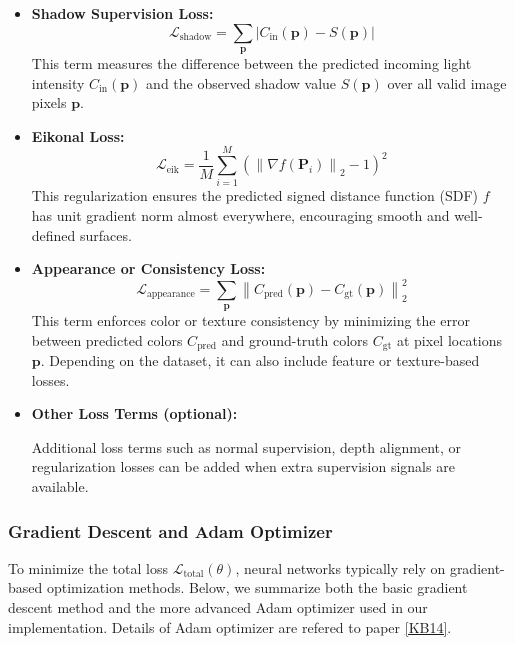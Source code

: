 \documentclass[12pt]{article}
\theoremstyle{definition}
\begin{document}
\begin{itemize}
    \item \textbf{Shadow Supervision Loss:}
    \begin{equation}
    \mathcal{L}_{\text{shadow}} = \sum_{\mathbf{p}} \left| C_{\mathrm{in}}(\mathbf{p}) - S(\mathbf{p}) \right|
    \end{equation}
    This term measures the difference between the predicted incoming light intensity $C_{\mathrm{in}}(\mathbf{p})$ and the observed shadow value $S(\mathbf{p})$ over all valid image pixels $\mathbf{p}$.

    \item \textbf{Eikonal Loss:}
    \begin{equation}
    \mathcal{L}_{\text{eik}} = \frac{1}{M} \sum_{i=1}^M \left( \left\| \nabla f(\mathbf{P}_i) \right\|_2 - 1 \right)^2
    \end{equation}
    This regularization ensures the predicted signed distance function (SDF) $f$ has unit gradient norm almost everywhere, encouraging smooth and well-defined surfaces.

    \item \textbf{Appearance or Consistency Loss:}
    \begin{equation}
    \mathcal{L}_{\text{appearance}} = \sum_{\mathbf{p}} \left\| C_{\text{pred}}(\mathbf{p}) - C_{\text{gt}}(\mathbf{p}) \right\|_2^2
    \end{equation}
    This term enforces color or texture consistency by minimizing the error between predicted colors $C_{\text{pred}}$ and ground-truth colors $C_{\text{gt}}$ at pixel locations $\mathbf{p}$. Depending on the dataset, it can also include feature or texture-based losses.

    \item \textbf{Other Loss Terms (optional):}
    
    Additional loss terms such as normal supervision, depth alignment, or regularization losses can be added when extra supervision signals are available.
\end{itemize}

\newpage

\subsubsection{Gradient Descent and Adam Optimizer} \label{sec:adam_optimizer}

To minimize the total loss $\mathcal{L}_{\text{total}}(\theta)$, neural networks typically rely on gradient-based optimization methods. Below, we summarize both the basic gradient descent method and the more advanced Adam optimizer used in our implementation. Details of Adam optimizer are refered to paper \hyperlink{[KB14]}{[KB14]}.
\end{document}
